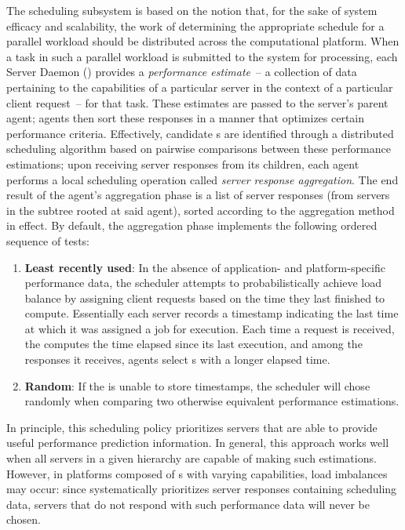 The \diet scheduling subsystem is based on the notion that, for the sake of
system efficacy and scalability, the work of determining the appropriate
schedule for a parallel workload should be distributed across the computational
platform.  When a task in such a parallel workload is submitted to the system
for processing, each Server Daemon (\sed) provides a \emph{performance
  estimate}~-- a collection of data pertaining to the capabilities of a
particular server in the context of a particular client request~-- for that
task.  These estimates are passed to the server's parent agent; agents then
sort these responses in a manner that optimizes certain performance criteria.
Effectively, candidate {\sed}s are identified through a distributed scheduling
algorithm based on pairwise comparisons between these performance estimations;
upon receiving server responses from its children, each agent performs a local
scheduling operation called \emph{server response aggregation}.  The end result
of the agent's aggregation phase is a list of server responses (from servers in
the subtree rooted at said agent), sorted according to the aggregation method
in effect. By default, the aggregation phase implements the following ordered
sequence of tests:

\begin{enumerate}
\item \textbf{Least recently used}: In the absence of application- and
  platform-specific performance data, the \diet scheduler attempts to
  probabilistically achieve load balance by assigning client requests based on
  the time they last finished to compute.  Essentially each server records a
  timestamp indicating the last time at which it was assigned a job for
  execution.  Each time a request is received, the \sed computes the time elapsed
  since its last execution, and among the responses it receives, \diet agents
  select {\sed}s with a longer elapsed time.
\item \textbf{Random}: If the {\sed} is unable to store timestamps, the \diet
  scheduler will chose randomly when comparing two otherwise equivalent {\sed}
  performance estimations.
\end{enumerate}

In principle, this scheduling policy prioritizes servers that are able to
provide useful performance prediction information. 
In general, this approach works well when all servers in a
given \diet hierarchy are capable of making such estimations. However, in
platforms composed of {\sed}s with varying capabilities, load imbalances may
occur: since \diet systematically prioritizes server responses containing scheduling data,
servers that do not respond with such performance data will never be chosen.


